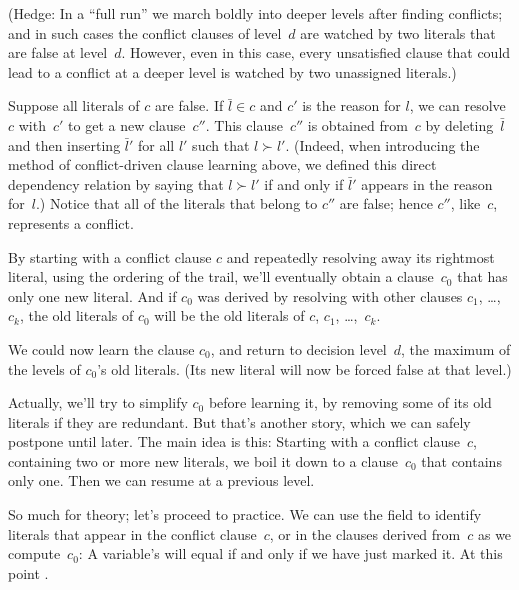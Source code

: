 (Hedge: In a ``full run'' we march boldly into deeper levels after
finding conflicts; and in such cases the conflict clauses of level~$d$
are watched by two literals that are false at level~$d$. However,
even in this case, every unsatisfied clause that could lead to a
conflict at a deeper level is watched by two unassigned literals.)

Suppose all literals of $c$ are false. If $\bar l\in c$ and $c'$ is the
reason for $l$, we can resolve $c$ with~$c'$ to get a new clause~$c''$.
This clause~$c''$ is obtained from~$c$ by deleting~$\bar l$ and
then inserting $\bar l'$ for all $l'$ such that $l\succ l'$. (Indeed,
when introducing the method of conflict-driven clause learning above,
we defined this direct dependency relation by saying that $l\succ l'$ if and
only if $\bar l'$ appears in the reason for~$l$.)
Notice that all of the literals that belong to $c''$ are false;
hence $c''$, like~$c$, represents a conflict.

By starting with a conflict clause $c$ and repeatedly
resolving away its rightmost literal, using the ordering of the trail,
we'll eventually obtain
a clause~$c_0$ that has only one new literal. And if $c_0$ was derived by
resolving with other clauses $c_1$, \dots,~$c_k$, the old literals of $c_0$
will be the old literals of $c$, $c_1$, \dots,~$c_k$.

We could now learn the clause $c_0$, and return to decision level~$d$,
the maximum of the levels of $c_0$'s old literals. (Its new literal
will now be forced false at that level.)

Actually, we'll try to simplify $c_0$ before learning it,
by removing some of its old literals if they are redundant. But that's
another story, which we can safely postpone until later. The main idea
is this: Starting with a conflict clause~$c$, containing two or more new
literals, we boil it down to a clause~$c_0$ that contains only one.
Then we can resume at a previous level.

\fi

So much for theory; let's proceed to practice. We can use
the 
field to identify literals that appear in the conflict clause~$c$, or in the
clauses derived from~$c$ as we compute~$c_0$: A variable's  will
equal  if and only if we have just marked it.
At this point .

